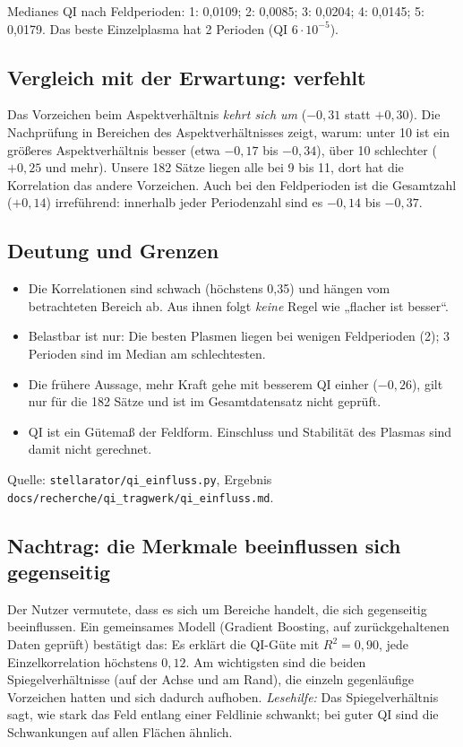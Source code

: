 \smallskip
\noindent Medianes QI nach Feldperioden: 1: 0,0109; 2: 0,0085; 3: 0,0204; 4: 0,0145; 5: 0,0179. Das beste Einzelplasma hat
2 Perioden (QI $6\cdot10^{-5}$).

\subsection*{Vergleich mit der Erwartung: verfehlt}
Das Vorzeichen beim Aspektverhältnis \emph{kehrt sich um} ($-0{,}31$ statt $+0{,}30$). Die Nachprüfung in Bereichen des
Aspektverhältnisses zeigt, warum: unter 10 ist ein größeres Aspektverhältnis besser (etwa $-0{,}17$ bis $-0{,}34$), über 10
schlechter ($+0{,}25$ und mehr). Unsere 182 Sätze liegen alle bei 9 bis 11, dort hat die Korrelation das andere
Vorzeichen. Auch bei den Feldperioden ist die Gesamtzahl ($+0{,}14$) irreführend: innerhalb jeder Periodenzahl
sind es $-0{,}14$ bis $-0{,}37$.

\subsection*{Deutung und Grenzen}
\begin{itemize}\itemsep1pt
\item Die Korrelationen sind schwach (höchstens 0,35) und hängen vom betrachteten Bereich ab. Aus ihnen folgt
  \emph{keine} Regel wie „flacher ist besser“.
\item Belastbar ist nur: Die besten Plasmen liegen bei wenigen Feldperioden (2); 3 Perioden sind im Median am schlechtesten.
\item Die frühere Aussage, mehr Kraft gehe mit besserem QI einher ($-0{,}26$), gilt nur für die 182 Sätze und ist im
  Gesamtdatensatz nicht geprüft.
\item QI ist ein Gütemaß der Feldform. Einschluss und Stabilität des Plasmas sind damit nicht gerechnet.
\end{itemize}
Quelle: \texttt{stellarator/qi\_einfluss.py}, Ergebnis \texttt{docs/recherche/qi\_tragwerk/qi\_einfluss.md}.

\subsection*{Nachtrag: die Merkmale beeinflussen sich gegenseitig}
Der Nutzer vermutete, dass es sich um Bereiche handelt, die sich gegenseitig beeinflussen. Ein gemeinsames Modell
(Gradient Boosting, auf zurückgehaltenen Daten geprüft) bestätigt das: Es erklärt die QI-Güte mit $R^2=0{,}90$, jede
Einzelkorrelation höchstens $0{,}12$. Am wichtigsten sind die beiden Spiegelverhältnisse (auf der Achse und am Rand), die
einzeln gegenläufige Vorzeichen hatten und sich dadurch aufhoben. \emph{Lesehilfe:} Das Spiegelverhältnis sagt, wie stark
das Feld entlang einer Feldlinie schwankt; bei guter QI sind die Schwankungen auf allen Flächen ähnlich.

